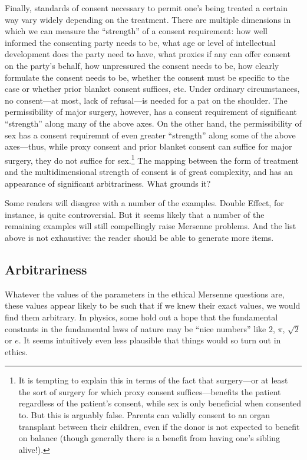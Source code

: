 Finally, standards of consent necessary to permit one's being treated a certain way vary widely depending on the treatment.
There are multiple dimensions in which we can measure the ``strength'' of a consent requirement: how well informed the 
consenting party needs to be, what age or level of intellectual development does the party need to have, what proxies if
any can offer consent on the party's behalf, how unpressured the consent needs to be, how clearly formulate the consent
needs to be, whether the consent must be specific to the case or whether prior blanket consent suffices, etc.
Under ordinary circumstances, no consent---at most, lack of refusal---is needed for a pat on the shoulder. The permissibility
of major surgery, however, has a consent requirement of significant ``strength'' along many of the above axes. On the other hand,
the permissibility of sex has a consent requiremnt of even greater ``strength'' along some of the above axes---thus, while
proxy consent and prior blanket consent can suffice for major surgery, they do not suffice for sex.\footnote{It is tempting
to explain this in terms of the fact that surgery---or at least the sort of surgery for which proxy consent suffices---benefits 
the patient regardless of the patient's consent, while sex is only beneficial when consented to. But this is arguably false.
Parents can validly consent to an organ transplant between their children, even if the donor is not expected to benefit
on balance (though generally there is a benefit from having one's sibling alive!).} The mapping between
the form of treatment and the multidimensional strength of consent is of great complexity, and has an appearance of significant
arbitrariness. What grounds it?

Some readers will disagree with a number of the examples. Double Effect, for instance, is quite controversial. But it seems
likely that a number of the remaining examples will still compellingly raise Mersenne problems. And the list above is not
exhaustive: the reader should be able to generate more items.

\subsection{Arbitrariness}
Whatever the values of the parameters in the ethical Mersenne questions are, these values appear likely to be such 
that if we knew their exact values, we would find them arbitrary.
In physics, some hold out a hope that the fundamental constants in the fundamental laws of nature may be ``nice numbers'' like
$2$, $\pi$, $\sqrt 2$ or $e$. It seems intuitively even less plausible that things would so turn out in ethics. 

